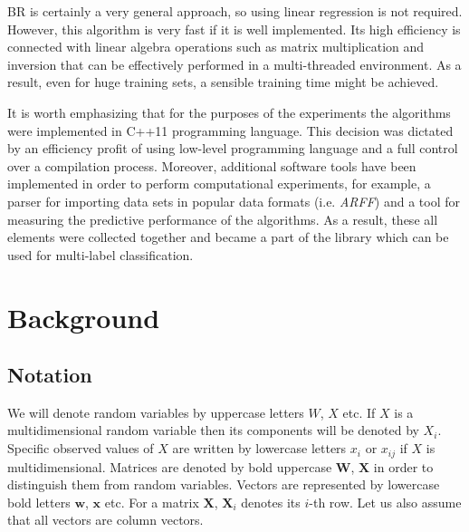\documentclass[english,a4paper,twoside]{ppfcmthesis}
\begin{document}
BR is certainly a very general approach, so using linear regression is not required. However, this algorithm is very fast if it is well implemented. Its high efficiency is connected with linear algebra operations such as matrix multiplication and inversion that can be effectively performed in a multi-threaded environment. As a result, even for huge training sets, a sensible training time might be achieved. 

It is worth emphasizing that for the purposes of the experiments the algorithms were implemented in C++11 programming language. This decision was dictated by an efficiency profit of using low-level programming language and a full control over a compilation process. Moreover, additional software tools have been implemented in order to perform computational experiments, for example, a parser for importing data sets in popular data formats (i.e. \textit{ARFF}) and a tool for measuring the predictive performance of the algorithms. As a result, these all elements were collected together and became a part of the library which can be used for multi-label classification.

\chapter{Background}
\section{Notation}

We will denote random variables by uppercase letters $W$, $X$ etc. If $X$ is a multidimensional random variable then its components will be denoted by $X_i$. Specific observed values of $X$ are written by lowercase letters $x_i$ or $x_{ij}$ if $X$ is multidimensional. Matrices are denoted by bold uppercase $\boldsymbol{W}$, $\boldsymbol{X}$ in order to distinguish them from random variables. Vectors are represented by lowercase bold letters $\boldsymbol{w}$, $\boldsymbol{x}$ etc. For a matrix $\boldsymbol{X}$, $\boldsymbol{X}_{i}$ denotes its $i$-th row. Let us also assume that all vectors are column vectors. 
\end{document}
